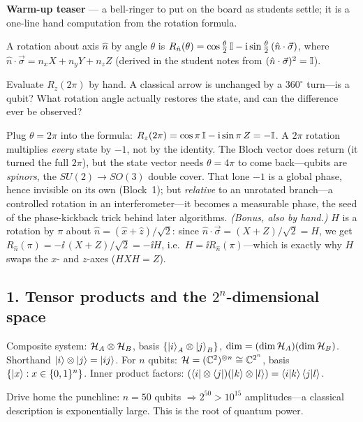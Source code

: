 \documentclass[11pt]{article}
\begin{document}
\medskip
\noindent\textbf{Warm-up teaser } --- a bell-ringer to put on the board as
students settle; it is a one-line hand computation from the rotation formula.
\begin{board}
A rotation about axis $\hat n$ by angle $\theta$ is
$R_{\hat n}(\theta)=\cos\tfrac\theta2\,\mathbb{I}-\mathrm{i}\sin\tfrac\theta2\,(\hat n\cdot\vec\sigma)$,
where $\hat n\cdot\vec\sigma=n_xX+n_yY+n_zZ$ (derived in the student notes from
$(\hat n\cdot\vec\sigma)^2=\mathbb{I}$).
\end{board}
\begin{inclass}\label{ic:spinor}
Evaluate $R_z(2\pi)$ by hand. A classical arrow is unchanged by a $360^\circ$ turn---is
a qubit? What rotation angle actually restores the state, and can the difference ever
be observed?
\end{inclass}
\begin{answer}
Plug $\theta=2\pi$ into the formula: $R_z(2\pi)=\cos\pi\,\mathbb{I}-\mathrm{i}\sin\pi\,Z=-\mathbb{I}$. A
$2\pi$ rotation multiplies \emph{every} state by $-1$, not by the identity. The Bloch
vector does return (it turned the full $2\pi$), but the state vector needs
$\theta=4\pi$ to come back---qubits are \emph{spinors}, the $SU(2)\to SO(3)$ double
cover. That lone $-1$ is a global phase, hence invisible on its own (Block~1); but
\emph{relative} to an unrotated branch---a controlled rotation in an
interferometer---it becomes a measurable phase, the seed of the phase-kickback trick
behind later algorithms.
\emph{(Bonus, also by hand.)} $H$ is a rotation by $\pi$ about $\hat
n=(\hat x+\hat z)/\sqrt2$: since $\hat n\cdot\vec\sigma=(X+Z)/\sqrt2=H$, we get
$R_{\hat n}(\pi)=-\ii\,(X+Z)/\sqrt2=-\ii H$, i.e.\ $H=\ii R_{\hat n}(\pi)$---which is
exactly why $H$ swaps the $x$- and $z$-axes ($HXH=Z$).
\end{answer}

\subsection*{1. Tensor products and the $2^n$-dimensional space }
\begin{board}
Composite system: $\mathcal{H}_A\otimes\mathcal{H}_B$, basis $\{\ket i_A\otimes\ket j_B\}$,
$\dim=(\dim\mathcal{H}_A)(\dim\mathcal{H}_B)$.
Shorthand $\ket i\otimes\ket j=\ket{ij}$. For $n$ qubits:
$\mathcal{H}=(\mathbb{C}^2)^{\otimes n}\cong\mathbb{C}^{2^n}$, basis $\{\ket x:x\in\{0,1\}^n\}$.
Inner product factors: $(\bra i\otimes\bra j)(\ket k\otimes\ket l)=\braket{i|k}\braket{j|l}$.
\end{board}
Drive home the punchline: $n=50$ qubits $\Rightarrow 2^{50}>10^{15}$ amplitudes---a
classical description is exponentially large. This is the root of quantum power.
\end{document}
